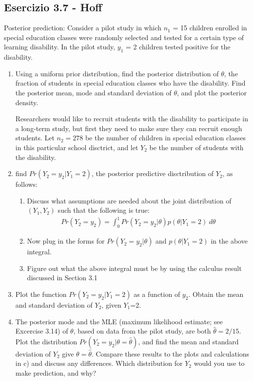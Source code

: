 \subsection{Esercizio 3.7 - Hoff}

Posterior prediction: Consider a pilot study in which $n_1$ = 15 children enrolled in special education classes were randomly selected and tested for a certain type of learning disability. In the pilot study, $y_1$ = 2 children tested positive for the disability.

\begin{enumerate}[label=\alph*)]
    \item Using a uniform prior distribution, find the posterior distribution of $\theta$, the fraction of students in special education classes who have the disability. Find the posterior mean, mode and standard deviation of $\theta$, and plot the posterior density.
    \par Researchers would like to recruit students with the disability to participate in a long-term study, but first they need to make sure they can recruit enough students. Let $n_2 = 278$ be the number of children in special education classes in this particular school disctrict, and let $Y_2$ be the number of students with the disability.
    
    \item find $Pr(Y_2=y_2 | Y_1 = 2)$, the posterior predictive disctribution of $Y_2$, as follows:
    \begin{enumerate}[label=\roman*.]
        \item Discuss what assumptions are needed about the joint distribution of $(Y_1,Y_2)$ such that the following is true:
        \begin{align*}
            Pr(Y_2=y_2) = \int_0^1 Pr(Y_2=y_2|\theta)p(\theta|Y_1=2)\ d\theta 
        \end{align*}
        \item Now plug in the forms for $Pr(Y_2=y_2|\theta)$ and $p(\theta|Y_1=2)$ in the above integral.
        \item Figure out what the above integral must be by using the calculus result discussed in Section 3.1
    \end{enumerate}
    \item Plot the function $Pr(Y_2=y_2|Y_1=2)$ as a function of $y_2$. Obtain the mean and standard deviation of $Y_2$, given $Y_1$=2.
    \item The posterior mode and the MLE (maximum likelihood estimate; see Excercise 3.14) of $\theta$, based on data from the pilot study, are both $\hat{\theta} = 2/15$. Plot the distribution $Pr(Y_2=y_2|\theta=\hat{\theta})$, and find the mean and standard deviation of $Y_2$ give $\theta=\hat{\theta}$. Compare these results to the plots and calculations in c) and discuss any differences. Which distribution for $Y_2$ would you use to make prediction, and why?
\end{enumerate}

